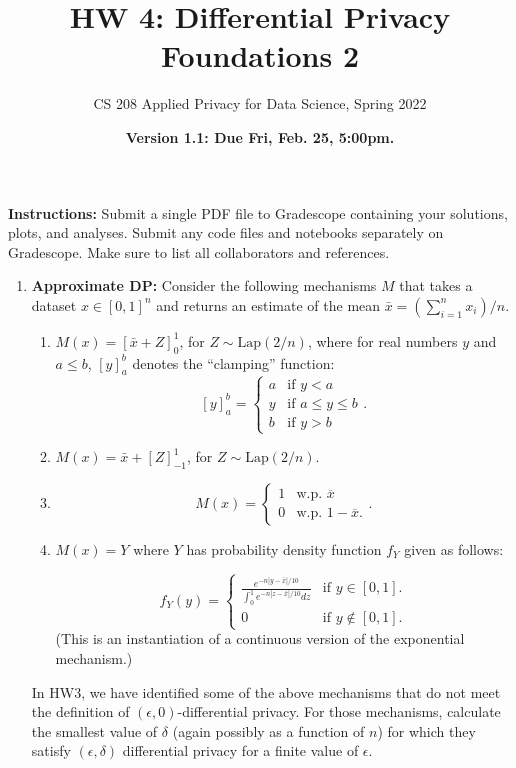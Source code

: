 \documentclass[11pt]{article}
\title{\vspace{-1.5cm} HW 4: Differential Privacy Foundations 2}
\author{CS 208 Applied Privacy for Data Science, Spring 2022}
\date{\textbf{Version 1.1: Due Fri, Feb. 25, 5:00pm.}}
\newcommand{\instructions}{\noindent \textbf{Instructions:} Submit a single PDF file to Gradescope containing your solutions, plots, and analyses. Submit any code files and notebooks separately on Gradescope. Make sure to list all collaborators and references.}
\begin{document}
\maketitle

\instructions

\begin{enumerate}[leftmargin=*]

\item \textbf{Approximate DP:} Consider the following mechanisms $M$ that takes a dataset $x\in [0,1]^n$ and returns
an estimate of the mean $\bar{x} = (\sum_{i=1}^n x_i)/n$.

\begin{enumerate}[label=\roman*.]
    \item $M(x) = [\bar{x}+Z]^1_0$, for $Z\sim \mathrm{Lap}(2/n)$,
    where for real numbers $y$ and $a\leq b$, $[y]^b_a$ denotes the ``clamping'' function:
$$[y]^b_a = 
\begin{cases}
a & \text{if } y < a\\
y & \text{if } a\leq y\leq b\\
b & \text{if } y >b
\end{cases}.$$
    \item $M(x) = \bar{x}+[Z]^1_{-1}$, for $Z\sim \mathrm{Lap}(2/n)$.
    \item 
    $$M(x) = \begin{cases} 1 & \text{w.p. } \overline{x}\\
    0 & \text{w.p. } 1-\overline{x}.
    \end{cases}.$$
    \item $M(x) = Y$ where $Y$ has probability density function $f_Y$ given as follows:
    
    $$f_Y(y) = \begin{cases}
    \frac{e^{-n|y-\bar{x}|/10}}{\int_0^1 e^{-n|z-\bar{x}|/10} dz} & \text{if } y\in [0,1].\\
    0 & \text{if } y\notin [0,1].
    \end{cases}$$
    (This is an instantiation of a continuous version
    of the exponential mechanism.)
    
\end{enumerate}

In HW3, we have identified some of the above mechanisms that do not meet the definition of $(\epsilon,0)$-differential privacy. For those mechanisms,
    calculate the smallest value of $\delta$ (again possibly as a function of $n$) for which they satisfy $(\epsilon,\delta)$ differential privacy for a finite value of $\epsilon$.


\end{enumerate}
\end{document}
